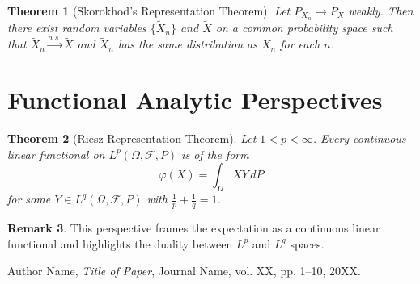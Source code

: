 \documentclass[11pt,reqno]{amsart}
\newtheorem{theorem}{Theorem}[section]
\theoremstyle{definition}
\newtheorem{remark}[theorem]{Remark}
\theoremstyle{remark}
\begin{document}
\begin{theorem}[Skorokhod's Representation Theorem]
	Let $P_{X_n} \to P_X$ weakly. Then there exist random variables $\{\tilde{X}_n\}$ and $\tilde{X}$ on a common probability space such that $\tilde{X}_n \xrightarrow{a.s.} \tilde{X}$ and $\tilde{X}_n$ has the same distribution as $X_n$ for each $n$.
\end{theorem}

\section{Functional Analytic Perspectives}

\begin{theorem}[Riesz Representation Theorem]
	Let $1 < p < \infty$. Every continuous linear functional on $L^p(\Omega, \mathcal{F}, P)$ is of the form
	\[
		\varphi(X) = \int_\Omega X Y \, dP
	\]
	for some $Y \in L^q(\Omega, \mathcal{F}, P)$ with $\frac{1}{p} + \frac{1}{q}=1$.
\end{theorem}

\begin{remark}
	This perspective frames the expectation as a continuous linear functional and highlights the duality between $L^p$ and $L^q$ spaces.
\end{remark}


\begin{thebibliography}{9}

	Author Name, \emph{Title of Paper}, Journal Name, vol. XX, pp. 1--10, 20XX.

\end{thebibliography}
\end{document}
